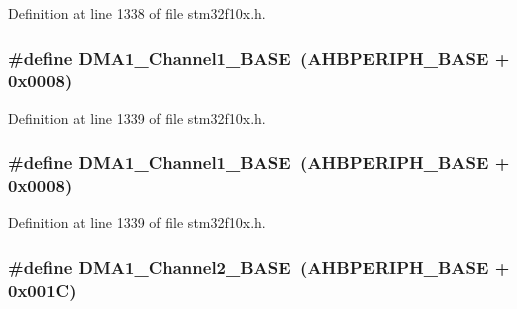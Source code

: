 Definition at line 1338 of file stm32f10x.\+h.

\subsubsection[{\texorpdfstring{D\+M\+A1\+\_\+\+Channel1\+\_\+\+B\+A\+SE}{DMA1_Channel1_BASE}}]{\setlength{\rightskip}{0pt plus 5cm}\#define D\+M\+A1\+\_\+\+Channel1\+\_\+\+B\+A\+SE~({\bf A\+H\+B\+P\+E\+R\+I\+P\+H\+\_\+\+B\+A\+SE} + 0x0008)}\hypertarget{group___peripheral__memory__map_ga888dbc1608243badeb3554ffedc7364c}{}\label{group___peripheral__memory__map_ga888dbc1608243badeb3554ffedc7364c}


Definition at line 1339 of file stm32f10x.\+h.

\subsubsection[{\texorpdfstring{D\+M\+A1\+\_\+\+Channel1\+\_\+\+B\+A\+SE}{DMA1_Channel1_BASE}}]{\setlength{\rightskip}{0pt plus 5cm}\#define D\+M\+A1\+\_\+\+Channel1\+\_\+\+B\+A\+SE~({\bf A\+H\+B\+P\+E\+R\+I\+P\+H\+\_\+\+B\+A\+SE} + 0x0008)}\hypertarget{group___peripheral__memory__map_ga888dbc1608243badeb3554ffedc7364c}{}\label{group___peripheral__memory__map_ga888dbc1608243badeb3554ffedc7364c}


Definition at line 1339 of file stm32f10x.\+h.

\subsubsection[{\texorpdfstring{D\+M\+A1\+\_\+\+Channel2\+\_\+\+B\+A\+SE}{DMA1_Channel2_BASE}}]{\setlength{\rightskip}{0pt plus 5cm}\#define D\+M\+A1\+\_\+\+Channel2\+\_\+\+B\+A\+SE~({\bf A\+H\+B\+P\+E\+R\+I\+P\+H\+\_\+\+B\+A\+SE} + 0x001\+C)}\hypertarget{group___peripheral__memory__map_ga38a70090eef3687e83fa6ac0c6d22267}{}\label{group___peripheral__memory__map_ga38a70090eef3687e83fa6ac0c6d22267}


